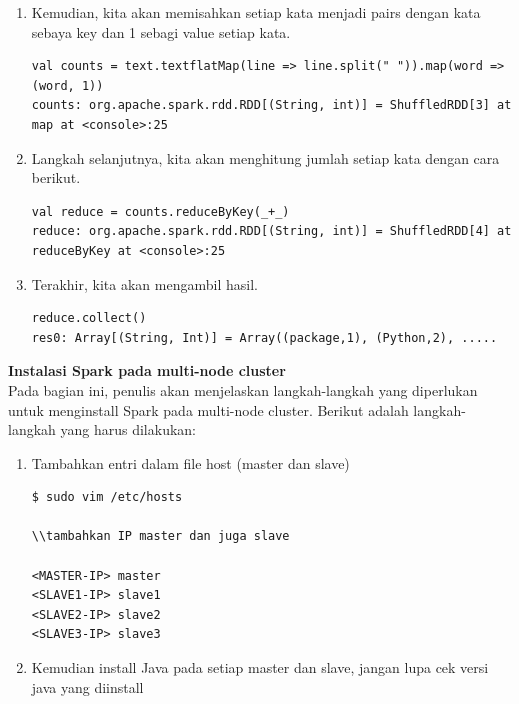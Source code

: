 \documentclass[a4paper,twoside]{article}
\begin{document}
\begin{enumerate}
\begin{enumerate}
\item Kemudian, kita akan memisahkan setiap kata menjadi pairs dengan kata sebaya key dan 1 sebagi value setiap kata.

\begin{verbatim}
val counts = text.textflatMap(line => line.split(" ")).map(word => (word, 1))
counts: org.apache.spark.rdd.RDD[(String, int)] = ShuffledRDD[3] at map at <console>:25
\end{verbatim}

\item Langkah selanjutnya, kita akan menghitung jumlah setiap kata dengan cara berikut.

\begin{verbatim}
val reduce = counts.reduceByKey(_+_)
reduce: org.apache.spark.rdd.RDD[(String, int)] = ShuffledRDD[4] at reduceByKey at <console>:25
\end{verbatim}

\item Terakhir, kita akan mengambil hasil.

\begin{verbatim}
reduce.collect()
res0: Array[(String, Int)] = Array((package,1), (Python,2), ..... 
\end{verbatim}

\end{enumerate}

\textbf{Instalasi Spark pada multi-node cluster}\\

Pada bagian ini, penulis akan menjelaskan langkah-langkah yang diperlukan untuk menginstall Spark pada multi-node cluster. Berikut adalah langkah-langkah yang harus dilakukan:

\begin{enumerate}

\item Tambahkan entri dalam file host (master dan slave)

\begin{verbatim}
$ sudo vim /etc/hosts

\\tambahkan IP master dan juga slave 

<MASTER-IP> master
<SLAVE1-IP> slave1
<SLAVE2-IP> slave2
<SLAVE3-IP> slave3
\end{verbatim}

\item Kemudian install Java pada setiap master dan slave, jangan lupa cek versi java yang diinstall


\end{enumerate}
\end{enumerate}
\end{document}
